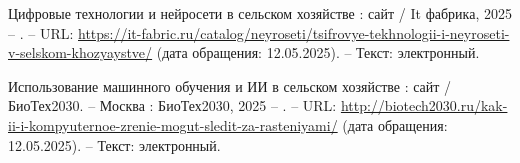 \begin{thebibliography}{9}
	 Цифровые технологии и нейросети в сельском хозяйстве : сайт / It фабрика, 2025 – . – URL: \url{https://it-fabric.ru/catalog/neyroseti/tsifrovye-tekhnologii-i-neyroseti-v-selskom-khozyaystve/} (дата обращения: 12.05.2025). – Текст: электронный.
	
	 Использование машинного обучения и ИИ в сельском хозяйстве : сайт / БиоТех2030. – Москва : БиоТех2030, 2025 – . – URL: \url{http://biotech2030.ru/kak-ii-i-kompyuternoe-zrenie-mogut-sledit-za-rasteniyami/} (дата обращения: 12.05.2025). – Текст: электронный.
	



\end{thebibliography}
